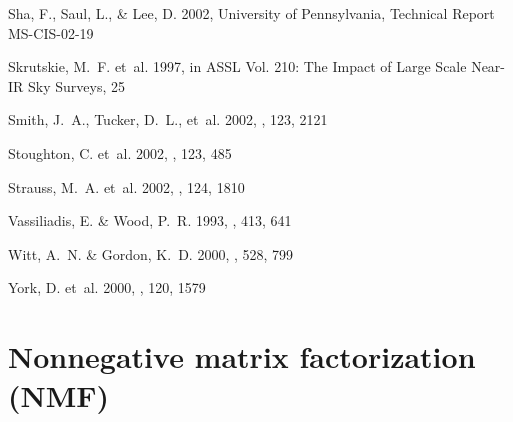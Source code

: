 \documentclass[12pt,preprint]{aastex}
\begin{document}
\begin{thebibliography}{44}
Sha, F., Saul, L., \& Lee, D. 2002, University of Pennsylvania, Technical
  Report MS-CIS-02-19

Skrutskie, M.~F. {et~al.} 1997, in ASSL Vol. 210: The Impact of Large Scale
  Near-IR Sky Surveys, 25

Smith, J.~A., Tucker, D.~L., {et~al.} 2002, \aj, 123, 2121

Stoughton, C. {et~al.} 2002, \aj, 123, 485

Strauss, M.~A. {et~al.} 2002, \aj, 124, 1810

{Vassiliadis}, E. \& {Wood}, P.~R. 1993, \apj, 413, 641

{Witt}, A.~N. \& {Gordon}, K.~D. 2000, \apj, 528, 799

York, D. {et~al.} 2000, \aj, 120, 1579

\end{thebibliography}

\appendix

\section{Nonnegative matrix factorization (NMF)}
\label{nmf}
\end{document}
